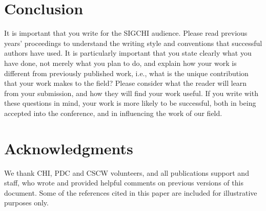 \documentclass[preprint]{../latex/sigchi-modern}
\begin{document}
%
%
\balance

\section{Conclusion}
It is important that you write for the SIGCHI audience. Please read previous
years' proceedings to understand the writing style and conventions that
successful authors have used.  It is particularly important that you state
clearly what you have done, not merely what you plan to do, and explain how your
work is different from previously published work, i.e., what is the unique
contribution that your work makes to the field?  Please consider what the reader
will learn from your submission, and how they will find your work useful. If you
write with these questions in mind, your work is more likely to be successful,
both in being accepted into the conference, and in influencing the work of our
field.

\section{Acknowledgments}
We thank CHI, PDC and CSCW volunteers, and all publications support and staff,
who wrote and provided helpful comments on previous versions of this document.
Some of the references cited in this paper are included for illustrative
purposes only.


\end{document}
